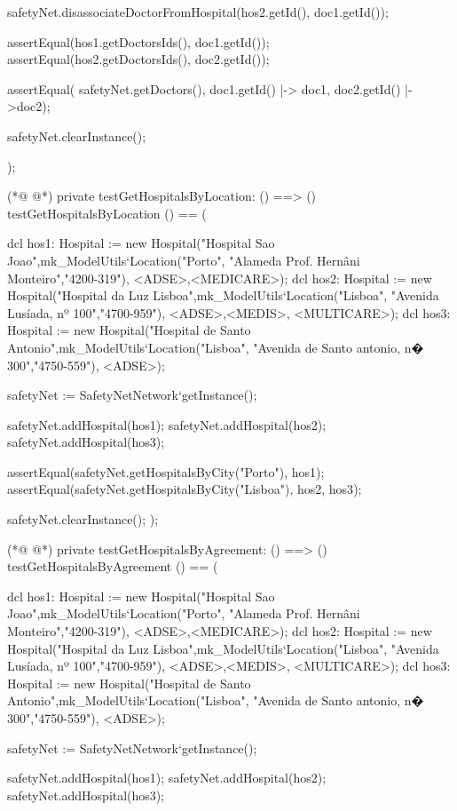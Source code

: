 \begin{vdmpp}[breaklines=true]
  
  safetyNet.disassociateDoctorFromHospital(hos2.getId(), doc1.getId());

  assertEqual(hos1.getDoctorsIds(), {doc1.getId()});
  assertEqual(hos2.getDoctorsIds(), {doc2.getId()});
  
  assertEqual( safetyNet.getDoctors(), {doc1.getId() |-> doc1, doc2.getId() |->doc2});
  
  safetyNet.clearInstance();
    
);

(*@
\label{testGetHospitalsByLocation:315}
@*)
private testGetHospitalsByLocation: () ==> ()
 testGetHospitalsByLocation () == (
   
  dcl hos1: Hospital := new Hospital("Hospital Sao Joao",mk_ModelUtils`Location("Porto", "Alameda Prof. Hernâni Monteiro","4200-319"), {<ADSE>,<MEDICARE>});
  dcl hos2: Hospital := new Hospital("Hospital da Luz Lisboa",mk_ModelUtils`Location("Lisboa", "Avenida Lusíada, nº 100","4700-959"), {<ADSE>,<MEDIS>, <MULTICARE>});
  dcl hos3: Hospital := new Hospital("Hospital de Santo Antonio",mk_ModelUtils`Location("Lisboa", "Avenida de Santo antonio, n� 300","4750-559"), {<ADSE>});
  
  safetyNet := SafetyNetNetwork`getInstance();
   
  safetyNet.addHospital(hos1);
  safetyNet.addHospital(hos2);
  safetyNet.addHospital(hos3);
 
  assertEqual(safetyNet.getHospitalsByCity("Porto"), {hos1});
  assertEqual(safetyNet.getHospitalsByCity("Lisboa"), {hos2, hos3});
 
  safetyNet.clearInstance();
);

(*@
\label{testGetHospitalsByAgreement:334}
@*)
private testGetHospitalsByAgreement: () ==> ()
 testGetHospitalsByAgreement () == (
   
  dcl hos1: Hospital := new Hospital("Hospital Sao Joao",mk_ModelUtils`Location("Porto", "Alameda Prof. Hernâni Monteiro","4200-319"), {<ADSE>,<MEDICARE>});
  dcl hos2: Hospital := new Hospital("Hospital da Luz Lisboa",mk_ModelUtils`Location("Lisboa", "Avenida Lusíada, nº 100","4700-959"), {<ADSE>,<MEDIS>, <MULTICARE>});
  dcl hos3: Hospital := new Hospital("Hospital de Santo Antonio",mk_ModelUtils`Location("Lisboa", "Avenida de Santo antonio, n� 300","4750-559"), {<ADSE>});
  
  safetyNet := SafetyNetNetwork`getInstance();
   
  safetyNet.addHospital(hos1);
  safetyNet.addHospital(hos2);
  safetyNet.addHospital(hos3);
 

\end{vdmpp}

